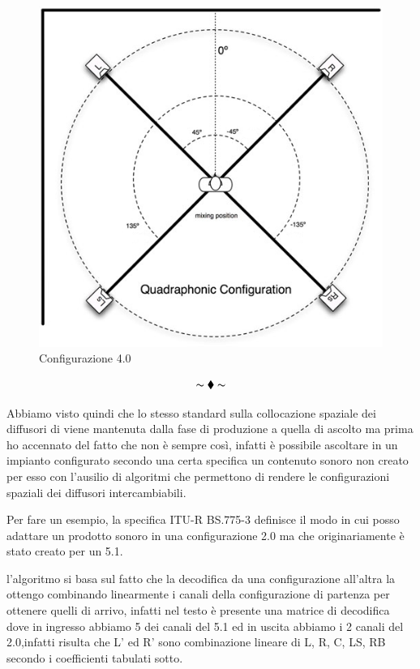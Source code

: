 \documentclass[12pt,a4paper]{report}
\begin{document}
\begin{figure}[htbp]
	\centering
	\includegraphics[scale=0.35]{figures/quad.jpg}
	\caption {Configurazione 4.0}
	\label{fig:quadrifonia}
	\end{figure}

\[\thicksim\blacklozenge \thicksim \]

Abbiamo visto quindi che lo stesso standard sulla collocazione spaziale dei diffusori di viene mantenuta dalla fase di produzione a quella di ascolto ma prima ho accennato del fatto che non è sempre così, infatti è possibile ascoltare in un impianto configurato secondo una certa specifica un contenuto sonoro non creato per esso con l'ausilio di algoritmi che permettono di rendere le configurazioni spaziali dei diffusori intercambiabili.

Per fare un esempio, la specifica ITU-R BS.775-3 definisce il modo in cui posso adattare un prodotto sonoro in una configurazione 2.0 ma che originariamente è stato creato per un 5.1.

l'algoritmo si basa sul fatto che la decodifica da una configurazione all'altra la ottengo combinando linearmente i canali della configurazione di partenza per ottenere quelli di arrivo, infatti nel testo è presente una matrice di decodifica dove in ingresso abbiamo 5 dei canali del 5.1 ed in uscita abbiamo i 2 canali del 2.0,infatti risulta che L' ed R' sono combinazione lineare di L, R, C, LS, RB secondo i coefficienti tabulati sotto.
\end{document}
